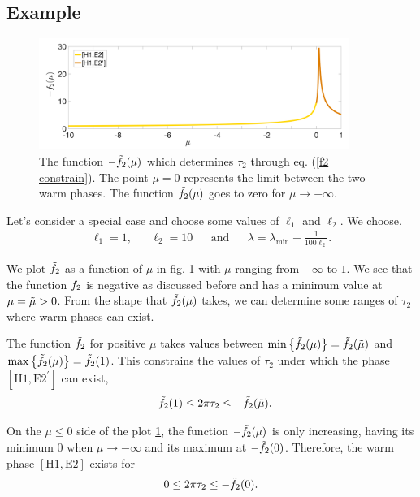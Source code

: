 \subsection{Example}

\begin{figure}
    \centering
    \includegraphics[width=0.9\textwidth]{figures/f2.png}
    \caption{The function $-\Tilde{f}_2(\mu)$ which determines $\tau_2$ through eq. (\ref{f2 constrain}). The point $\mu = 0$ represents the limit between the two warm phases. The function $\Tilde{f}_2(\mu)$ goes to zero for $\mu\rightarrow-\infty$.}
    \label{f2}
\end{figure}

Let's consider a special case and choose some values of $\ell_1$ and $\ell_2$. We choose,
\begin{align}
    \ell_1 = 1, && \ell_2 = 10 && \text{and} && \lambda = \lambda_{\text{min}} + \frac{1}{100\ell_2}.
\end{align}

We plot $\Tilde{f}_2$ as a function of $\mu$ in fig. \ref{f2} with $\mu$ ranging from $-\infty$ to $1$. We see that the function $\Tilde{f}_2$ is negative as discussed before and has a minimum value at $\mu = \Tilde{\mu}>0$. From the shape that $\Tilde{f}_2(\mu)$ takes, we can determine some ranges of $\tau_2$ where warm phases can exist.

The function $\Tilde{f}_2$ for positive $\mu$ takes values between $\min\left\{\Tilde{f}_2(\mu)\right\}=\Tilde{f}_2(\Tilde{\mu})$ and $\max\left\{\Tilde{f}_2(\mu)\right\} = \Tilde{f}_2(1)$. This constrains the values of $\tau_2$ under which the phase $\left[\text{H}1,\text{E}2^{\prime}\right]$ can exist,
\begin{equation}
    -\Tilde{f}_2(1)\leq 2\pi\tau_2\leq - \Tilde{f}_2(\Tilde{\mu}).
\end{equation}

On the $\mu\leq 0$ side of the plot \ref{f2}, the function $-\Tilde{f}_2(\mu)$ is only increasing, having its minimum 0 when $\mu\rightarrow-\infty$ and its maximum at $-\Tilde{f}_2(0)$. Therefore, the warm phase $\left[\text{H}1,\text{E}2\right]$ exists for
\begin{equation}
    0 \leq 2\pi\tau_2\leq - \Tilde{f}_2(0).
\end{equation}

